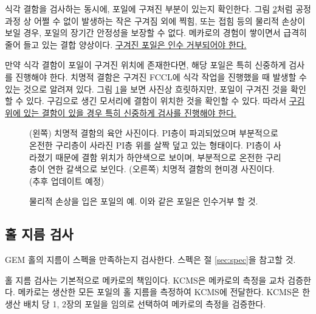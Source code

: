 식각 결함을 검사하는 동시에, 포일에 구져진 부분이 있는지 확인한다. 그림 \ref{fig:example_damaged_foils}처럼 공정 과정 상 어쩔 수 없이 발생하는 작은 구겨짐 외에 찍힘, 또는 접힘 등의 물리적 손상이 보일 경우, 포일의 장기간 안정성을 보장할 수 없다. 메카로의 경험이 쌓이면서 급격히 줄어 들고 있는 결합 양상이다. \uline{구겨진 포일은 인수 거부되어야 한다.}

만약 식각 결함이 포일이 구겨진 위치에 존재한다면, 해당 포일은 특히 신중하게 검사를 진행해야 한다. 치명적 결함은 구겨진 FCCL에 식각 작업을 진행했을 때 발생할 수 있는 것으로 알려져 있다. 그림 \ref{fig:defect_bad_zoom}을 보면 사진상 흐릿하지만, 포일이 구겨진 것을 확인할 수 있다. 구김으로 생긴 모서리에 결함이 위치한 것을 확인할 수 있다. 따라서 \uline{구김 위에 있는 결함이 있을 경우 특히 신중하게 검사를 진행해야 한다.}

\begin{figure}[htb]
  \centering
  \caption[치명적 식각 결함의 양상]{(왼쪽) 치명적 결함의 육안 사진이다. PI층이 파괴되었으며 부분적으로 온전한 구리층이 사라진 PI층 위를 살짝 덮고 있는 형태이다. PI층이 사라졌기 때문에 결함 위치가 하얀색으로 보이며, 부분적으로 온전한 구리층이 연한 갈색으로 보인다. (오른쪽) 치명적 결함의  현미경 사진이다. (추후 업데이트 예정)}
  \label{fig:defect_bad_zoom}
\end{figure} 

\begin{figure}[htb]
  \centering
  \caption[물리적 손상을 입은 포일의 예]{물리적 손상을 입은 포일의 예. 이와 같은 포일은 인수거부 할 것.}
  \label{fig:example_damaged_foils}
\end{figure}

\subsection{홀 지름 검사}
GEM 홀의 지름이 스펙을 만족하는지 검사한다. 스펙은 절 \ref{sec:spec}을 참고할 것.

홀 지름 검사는 기본적으로 메카로의 책임이다. KCMS은 메카로의 측정을 교차 검증한다. 메카로는 생산한 모든 포일의 홀 지름을 측정하여 KCMS에 전달한다. KCMS은 한 생산 배치 당 1, 2장의 포일을 임의로 선택하여 메카로의 측정을 검증한다.

